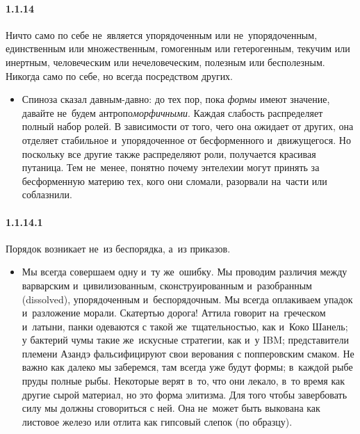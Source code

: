 \paragraph{1.1.14}\hypertarget{par:1.1.14}{} Ничто само по себе не~является упорядоченным или не~упорядоченным, единственным или множественным, гомогенным или гетерогенным, текучим или инертным, человеческим или нечеловеческим, полезным или бесполезным. Никогда само по себе, но всегда посредством других.
	\begin{itemize}
	\item Спиноза сказал давным-давно: до тех пор, пока {\itshape формы} имеют значение, давайте не~будем антропо{\itshape{морфичными}}. Каждая слабость распределяет полный набор ролей. В зависимости от того, чего она ожидает от других, она отделяет стабильное и~упорядоченное от бесформенного и~движущегося. Но поскольку все другие также распределяют роли, получается красивая путаница. Тем не~менее, понятно почему энтелехии могут принять за бесформенную материю тех, кого они сломали, разорвали на~части или соблазнили.

	\end{itemize}

\paragraph{1.1.14.1} Порядок возникает не~из беспорядка, а~из приказов.
	\begin{itemize}
	\item Мы всегда совершаем одну и~ту же~ошибку. Мы проводим различия между варварским и~цивилизованным, сконструированным и~разобранным (dissolved), упорядоченным и~беспорядочным. Мы всегда оплакиваем упадок и~разложение морали. Скатертью дорога! Аттила говорит на~греческом и~латыни, панки одеваются с такой же~тщательностью, как и~Коко Шанель; у бактерий чумы такие же~искусные стратегии, как и~у IBM; представители племени Азандэ фальсифицируют свои верования с попперовским смаком. Не важно как далеко мы заберемся, там всегда уже будут формы; в~каждой рыбе пруды полные рыбы. Некоторые верят в~то, что они лекало, в~то время как другие сырой материал, но это форма элитизма. Для того чтобы завербовать силу мы должны сговориться с ней. Она не~может быть выкована как листовое железо или отлита как гипсовый слепок (по образцу).

	\end{itemize}

